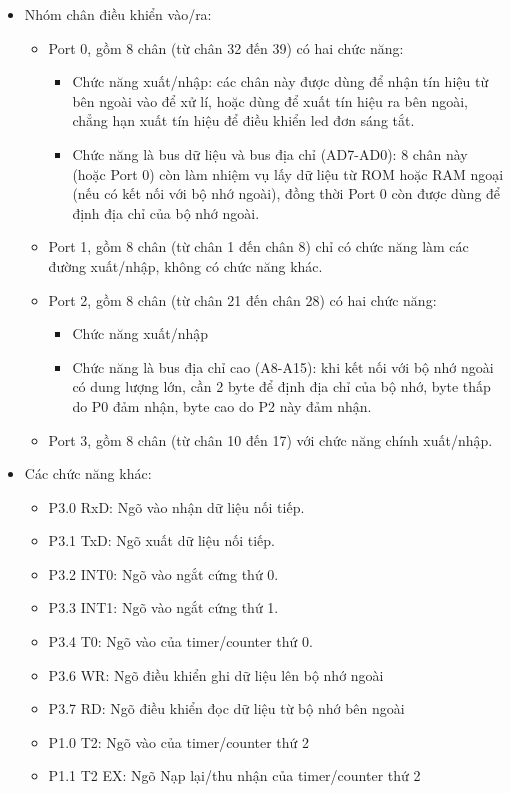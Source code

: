 \documentclass[../report.tex]{subfiles}
\begin{document}
\begin{itemize}
\item Nhóm chân điều khiển vào/ra: 
\begin{itemize}
\item Port 0, gồm 8 chân (từ chân 32 đến 39) có hai chức năng:
\begin{itemize}
    \item Chức năng xuất/nhập: các chân này được dùng để nhận tín hiệu từ bên ngoài vào để xử lí, 
    hoặc dùng để xuất tín hiệu ra bên ngoài, chẳng hạn xuất tín hiệu để điều khiển led đơn sáng tắt.
    \item Chức năng là bus dữ liệu và bus địa chỉ (AD7-AD0): 8 chân này (hoặc Port 0) còn làm nhiệm vụ 
    lấy dữ liệu từ ROM hoặc RAM ngoại (nếu có kết nối với bộ nhớ ngoài), 
    đồng thời Port 0 còn được dùng để định địa chỉ của bộ nhớ ngoài.
\end{itemize}

\item Port 1, gồm 8 chân (từ chân 1 đến chân 8) chỉ có chức năng làm các đường xuất/nhập, không có chức năng khác.
\item Port 2, gồm 8 chân (từ chân 21 đến chân 28) có hai chức năng:
\begin{itemize}
\item Chức năng xuất/nhập
\item Chức năng là bus địa chỉ cao (A8-A15): khi kết nối với bộ nhớ ngoài có dung lượng lớn,
cần 2 byte để định địa chỉ của bộ nhớ, byte thấp do P0 đảm nhận, byte cao do P2 này đảm nhận.
\end{itemize}
\item Port 3, gồm 8 chân (từ chân 10 đến 17) với chức năng chính xuất/nhập.
\end{itemize}
\item Các chức năng khác: 
\begin{itemize}
\item P3.0 RxD: Ngõ vào nhận dữ liệu nối tiếp. 
\item P3.1 TxD: Ngõ xuất dữ liệu nối tiếp. 
\item P3.2 INT0: Ngõ vào ngắt cứng thứ 0. 
\item P3.3 INT1: Ngõ vào ngắt cứng thứ 1. 
\item P3.4 T0: Ngõ vào của timer/counter thứ 0.
\item P3.6 WR: Ngõ điều khiển ghi dữ liệu lên bộ nhớ ngoài
\item P3.7 RD: Ngõ điều khiển đọc dữ liệu từ bộ nhớ bên ngoài
\item P1.0 T2: Ngõ vào của timer/counter thứ 2
\item P1.1 T2 EX: Ngõ Nạp lại/thu nhận của timer/counter thứ 2
\end{itemize}

\end{itemize}
\end{document}
